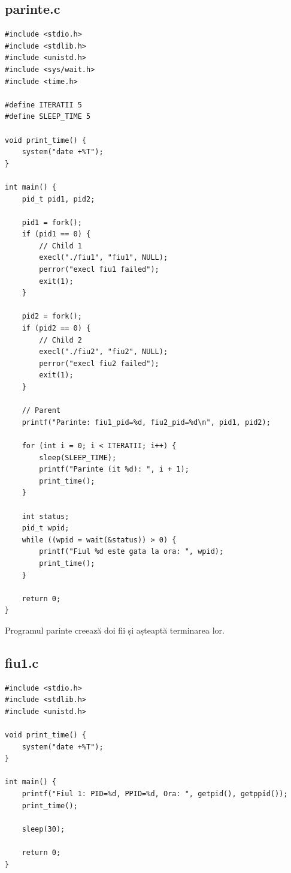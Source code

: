 \documentclass[11pt]{article}
\begin{document}
\subsection{parinte.c}
\label{sec:orge95c417}
\begin{verbatim}
#include <stdio.h>
#include <stdlib.h>
#include <unistd.h>
#include <sys/wait.h>
#include <time.h>

#define ITERATII 5
#define SLEEP_TIME 5

void print_time() {
    system("date +%T");
}

int main() {
    pid_t pid1, pid2;

    pid1 = fork();
    if (pid1 == 0) {
        // Child 1
        execl("./fiu1", "fiu1", NULL);
        perror("execl fiu1 failed");
        exit(1);
    }

    pid2 = fork();
    if (pid2 == 0) {
        // Child 2
        execl("./fiu2", "fiu2", NULL);
        perror("execl fiu2 failed");
        exit(1);
    }

    // Parent
    printf("Parinte: fiu1_pid=%d, fiu2_pid=%d\n", pid1, pid2);

    for (int i = 0; i < ITERATII; i++) {
        sleep(SLEEP_TIME);
        printf("Parinte (it %d): ", i + 1);
        print_time();
    }

    int status;
    pid_t wpid;
    while ((wpid = wait(&status)) > 0) {
        printf("Fiul %d este gata la ora: ", wpid);
        print_time();
    }

    return 0;
}
\end{verbatim}

Programul parinte creează doi fii și așteaptă terminarea lor.
\subsection{fiu1.c}
\label{sec:org5bc7e95}
\begin{verbatim}
#include <stdio.h>
#include <stdlib.h>
#include <unistd.h>

void print_time() {
    system("date +%T");
}

int main() {
    printf("Fiul 1: PID=%d, PPID=%d, Ora: ", getpid(), getppid());
    print_time();
    
    sleep(30);
    
    return 0;
}
\end{verbatim}
\end{document}
